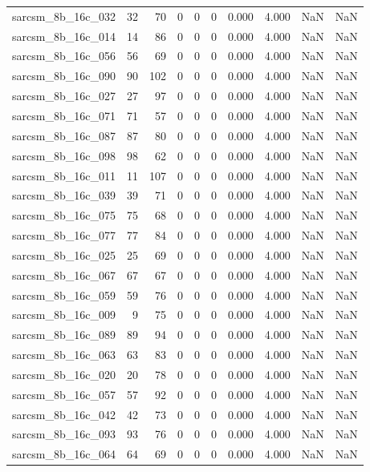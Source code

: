 \documentclass{article}
\begin{document}
\begin{longtable}{lrrrrrrrrr}
sarcsm\_8b\_16c\_032 & 32 & 70 & 0 & 0 & 0 & 0.000 & 4.000 & NaN & NaN \\
sarcsm\_8b\_16c\_014 & 14 & 86 & 0 & 0 & 0 & 0.000 & 4.000 & NaN & NaN \\
sarcsm\_8b\_16c\_056 & 56 & 69 & 0 & 0 & 0 & 0.000 & 4.000 & NaN & NaN \\
sarcsm\_8b\_16c\_090 & 90 & 102 & 0 & 0 & 0 & 0.000 & 4.000 & NaN & NaN \\
sarcsm\_8b\_16c\_027 & 27 & 97 & 0 & 0 & 0 & 0.000 & 4.000 & NaN & NaN \\
sarcsm\_8b\_16c\_071 & 71 & 57 & 0 & 0 & 0 & 0.000 & 4.000 & NaN & NaN \\
sarcsm\_8b\_16c\_087 & 87 & 80 & 0 & 0 & 0 & 0.000 & 4.000 & NaN & NaN \\
sarcsm\_8b\_16c\_098 & 98 & 62 & 0 & 0 & 0 & 0.000 & 4.000 & NaN & NaN \\
sarcsm\_8b\_16c\_011 & 11 & 107 & 0 & 0 & 0 & 0.000 & 4.000 & NaN & NaN \\
sarcsm\_8b\_16c\_039 & 39 & 71 & 0 & 0 & 0 & 0.000 & 4.000 & NaN & NaN \\
sarcsm\_8b\_16c\_075 & 75 & 68 & 0 & 0 & 0 & 0.000 & 4.000 & NaN & NaN \\
sarcsm\_8b\_16c\_077 & 77 & 84 & 0 & 0 & 0 & 0.000 & 4.000 & NaN & NaN \\
sarcsm\_8b\_16c\_025 & 25 & 69 & 0 & 0 & 0 & 0.000 & 4.000 & NaN & NaN \\
sarcsm\_8b\_16c\_067 & 67 & 67 & 0 & 0 & 0 & 0.000 & 4.000 & NaN & NaN \\
sarcsm\_8b\_16c\_059 & 59 & 76 & 0 & 0 & 0 & 0.000 & 4.000 & NaN & NaN \\
sarcsm\_8b\_16c\_009 & 9 & 75 & 0 & 0 & 0 & 0.000 & 4.000 & NaN & NaN \\
sarcsm\_8b\_16c\_089 & 89 & 94 & 0 & 0 & 0 & 0.000 & 4.000 & NaN & NaN \\
sarcsm\_8b\_16c\_063 & 63 & 83 & 0 & 0 & 0 & 0.000 & 4.000 & NaN & NaN \\
sarcsm\_8b\_16c\_020 & 20 & 78 & 0 & 0 & 0 & 0.000 & 4.000 & NaN & NaN \\
sarcsm\_8b\_16c\_057 & 57 & 92 & 0 & 0 & 0 & 0.000 & 4.000 & NaN & NaN \\
sarcsm\_8b\_16c\_042 & 42 & 73 & 0 & 0 & 0 & 0.000 & 4.000 & NaN & NaN \\
sarcsm\_8b\_16c\_093 & 93 & 76 & 0 & 0 & 0 & 0.000 & 4.000 & NaN & NaN \\
sarcsm\_8b\_16c\_064 & 64 & 69 & 0 & 0 & 0 & 0.000 & 4.000 & NaN & NaN \\

\end{longtable}
\end{document}
